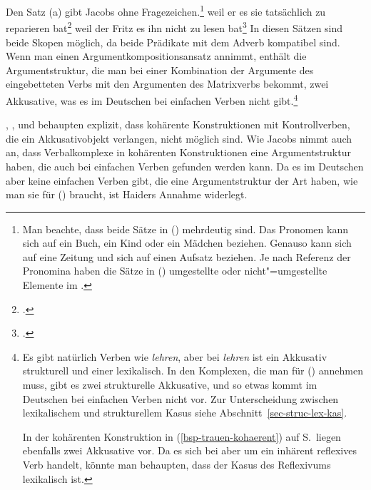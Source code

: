 Den Satz (a) gibt Jacobs ohne Fragezeichen.\footnote{%
\label{fn-scrambling-pronoun}%
        Man beachte, dass beide Sätze in () mehrdeutig sind.
        Das Pronomen  kann sich \zb auf ein Buch, ein Kind oder ein Mädchen beziehen.
        Genauso kann  sich auf eine Zeitung und  sich auf einen Aufsatz
        beziehen. Je nach Referenz der Pronomina haben die Sätze in ()
        umgestellte oder nicht"=umgestellte Elemente im \mf.%
}
\eal
\label{ex-coherent-bitten}
\ex
weil    er       es       sie       tatsächlich zu reparieren bat\label{bsp-er-es-sie-zu-reparieren-bat}\footnote{
        .
}
\ex{}
weil    der Fritz       es       ihn       nicht zu lesen bat\label{bsp-es-ihn-nicht-zu-lesen-bat}\footnote{
        .
}
\zl
In diesen Sätzen sind beide Skopen möglich, da beide Prädikate mit dem Adverb kompatibel sind.
Wenn man einen Argumentkompositionsansatz annimmt, enthält die Argumentstruktur, die man bei einer
Kombination der Argumente des eingebetteten Verbs mit den Argumenten des Matrixverbs bekommt,
zwei Akkusative, was es im Deutschen bei einfachen Verben nicht gibt.\footnote{
        Es gibt natürlich Verben wie \emph{lehren}, aber bei \emph{lehren} ist ein Akkusativ
        strukturell und einer lexikalisch. In den Komplexen, die man für () annehmen
        muss, gibt es zwei strukturelle Akkusative, und so etwas kommt im Deutschen bei einfachen
        Verben nicht vor. Zur Unterscheidung zwischen lexikalischem und strukturellem Kasus
        siehe Abschnitt~\ref{sec-struc-lex-kas}.

        In der kohärenten Konstruktion in (\ref{bsp-trauen-kohaerent}) auf S.\,\pageref{bsp-trauen-kohaerent}
        liegen ebenfalls zwei Akkusative vor. Da es sich bei  aber um ein inhärent
        reflexives Verb handelt, könnte man behaupten, dass der Kasus
        des Reflexivums lexikalisch ist.%
}

\citet[]{BK89a}, \citet[]{Haider90b},
\citet[]{VS98a} und \citet[]{Abraham2005a}
behaupten explizit, dass kohärente Konstruktionen mit Kontrollverben, die ein Akkusativobjekt verlangen,
nicht möglich sind.
Wie Jacobs nimmt auch \textcites[]{Haider86c}[]{Haider90b} an,
dass Verbalkomplexe in kohärenten Konstruktionen eine Argumentstruktur haben, die auch bei
einfachen Verben gefunden werden kann. Da es im Deutschen aber keine einfachen Verben gibt,
die eine Argumentstruktur der Art haben, wie man sie für () braucht, ist Haiders Annahme
widerlegt.

